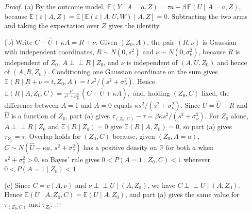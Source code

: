 \begin{proof}
(a) By the outcome model, $\mathbb E(Y\mid A=a,Z)=\tau a+\beta\,\mathbb E(U\mid A=a,Z)$, because $\mathbb E(\varepsilon\mid A,Z)=\mathbb E[\mathbb E(\varepsilon\mid A,U,W)\mid A,Z]=0$. Subtracting the two arms and taking the expectation over $Z$ gives the identity.

(b) Write $C-\widehat U+\kappa A=R+\nu$. Given $(Z_0,A)$, the pair $(R,\nu)$ is Gaussian with independent coordinates, $R\sim N(0,s^2)$ and $\nu\sim N(0,\sigma_\nu^2)$, because $R$ is independent of $Z_0$, $A\perp\!\!\!\perp R\mid Z_0$, and $\nu$ is independent of $(A,U,Z_0)$ and hence of $(A,R,Z_0)$. Conditioning one Gaussian coordinate on the sum gives $\mathbb E(R\mid R+\nu=t,Z_0,A)=t\,s^2/(s^2+\sigma_\nu^2)$. Hence
\(\mathbb E(R\mid A,Z_0,C)=\frac{s^2}{s^2+\sigma_\nu^2}\,(C-\widehat U+\kappa A),\)
and, holding $(Z_0,C)$ fixed, the difference between $A=1$ and $A=0$ equals $\kappa s^2/(s^2+\sigma_\nu^2)$. Since $U=\widehat U+R$ and $\widehat U$ is a function of $Z_0$, part (a) gives $\tau_{(Z_0,C)}-\tau=\beta\kappa s^2/(s^2+\sigma_\nu^2)$. For $Z_0$ alone, $A\perp\!\!\!\perp R\mid Z_0$ and $\mathbb E(R\mid Z_0)=0$ give $\mathbb E(R\mid A,Z_0)=0$, so part (a) gives $\tau_{Z_0}=\tau$. Overlap holds for $(Z_0,C)$ because, given $(Z_0,A=a)$, $C\sim N(\widehat U-\kappa a,\,s^2+\sigma_\nu^2)$ has a positive density on $\mathbb R$ for both $a$ when $s^2+\sigma_\nu^2>0$, so Bayes' rule gives $0<P(A=1\mid Z_0,C)<1$ wherever $0<P(A=1\mid Z_0)<1$.

(c) Since $C=c(A,\nu)$ and $\nu\perp\!\!\!\perp U\mid(A,Z_0)$, we have $C\perp\!\!\!\perp U\mid(A,Z_0)$. Hence $\mathbb E(U\mid A,Z_0,C)=\mathbb E(U\mid A,Z_0)$, and part (a) gives the same value for $\tau_{(Z_0,C)}$ and $\tau_{Z_0}$.
\end{proof}

